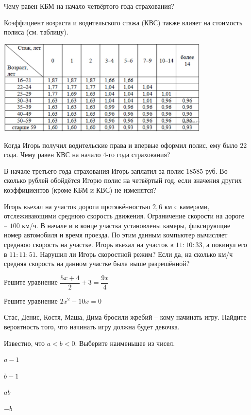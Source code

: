 \begin{homework}[number=2]
\begin{listofex}
	\item Чему равен КБМ на начало четвёртого года страхования?
	\item Коэффициент возраста и водительского стажа (КВС) также влияет на стоимость полиса (см. таблицу).
	\begin{center}
		\includegraphics[align=t, width=0.8\textwidth]{pics/G91M3H2-2}
	\end{center}
		Когда Игорь получил водительские права и впервые оформил полис, ему было \( 22 \) года. Чему равен КВС на начало \( 4 \)-го года страхования?
	\item В начале третьего года страхования Игорь заплатил за полис \( 18 585 \) руб. Во сколько рублей обойдётся Игорю полис на четвёртый год, если значения других коэффициентов (кроме КБМ и КВС) не изменятся?	
	\item Игорь въехал на участок дороги протяжённостью \( 2,6 \) км с камерами, отслеживающими среднюю скорость движения. Ограничение скорости на дороге -- \( 100  \) км/ч. В начале и в конце участка установлены камеры, фиксирующие номер автомобиля и время проезда. По этим данным компьютер вычисляет среднюю скорость на участке. Игорь въехал на участок в \( 11:10:33 \), а покинул его в \( 11:11:51 \). Нарушил ли Игорь скоростной режим? Если да, на сколько км/ч средняя скорость на данном участке была выше разрешённой?
	\item Решите уравнение \( \dfrac{5x+4}{2}+3=\dfrac{9x}{4} \)
	\item Решите уравнение \( 2x^2-10x=0 \)
	\item {}
	\item Стас, Денис, Костя, Маша, Дима бросили жребий -- кому начинать игру. Найдите вероятность того, что начинать игру должна будет девочка.
	\item Известно, что \( a<b<0 \). Выберите наименьшее из чисел.
	\begin{enumcols}[itemcolumns=1]
		\item \( a-1 \)
		\item \( b-1 \)
		\item \( ab \)
		\item \( -b \)
	\end{enumcols}
	\end{listofex}
\end{homework}
